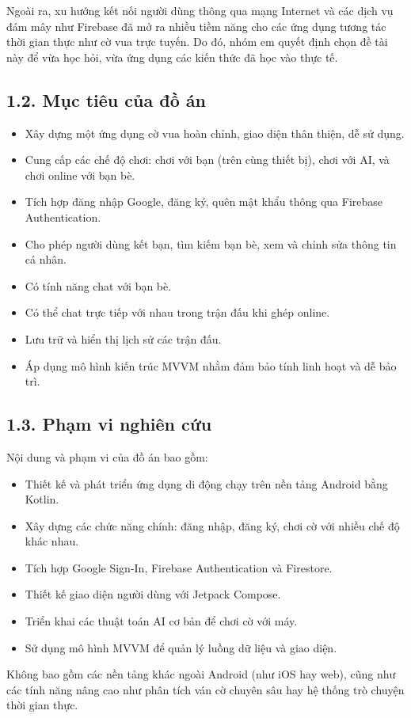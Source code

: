 \documentclass[a4paper,12pt]{article}
\begin{document}
\noindent Ngoài ra, xu hướng kết nối người dùng thông qua mạng Internet và các dịch vụ đám mây như Firebase đã mở ra nhiều tiềm năng cho các ứng dụng tương tác thời gian thực như cờ vua trực tuyến. Do đó, nhóm em quyết định chọn đề tài này để vừa học hỏi, vừa ứng dụng các kiến thức đã học vào thực tế.

\subsection*{1.2. Mục tiêu của đồ án} %

\justify
\begin{itemize}[label=·] %
    \item Xây dựng một ứng dụng cờ vua hoàn chỉnh, giao diện thân thiện, dễ sử dụng.
    \item Cung cấp các chế độ chơi: chơi với bạn (trên cùng thiết bị), chơi với AI, và chơi online với bạn bè.
    \item Tích hợp đăng nhập Google, đăng ký, quên mật khẩu thông qua Firebase Authentication.
    \item Cho phép người dùng kết bạn, tìm kiếm bạn bè, xem và chỉnh sửa thông tin cá nhân.
    \item Có tính năng chat với bạn bè.
    \item Có thể chat trực tiếp với nhau trong trận đấu khi ghép online. 
    \item Lưu trữ và hiển thị lịch sử các trận đấu.
    \item Áp dụng mô hình kiến trúc MVVM nhằm đảm bảo tính linh hoạt và dễ bảo trì.
\end{itemize}

\subsection*{1.3. Phạm vi nghiên cứu}

\justify
\noindent Nội dung và phạm vi của đồ án bao gồm:
\begin{itemize}[label=·]
    \item Thiết kế và phát triển ứng dụng di động chạy trên nền tảng Android bằng Kotlin.
    \item Xây dựng các chức năng chính: đăng nhập, đăng ký, chơi cờ với nhiều chế độ khác nhau.
    \item Tích hợp Google Sign-In, Firebase Authentication và Firestore.
    \item Thiết kế giao diện người dùng với Jetpack Compose.
    \item Triển khai các thuật toán AI cơ bản để chơi cờ với máy.
    \item Sử dụng mô hình MVVM để quản lý luồng dữ liệu và giao diện.
\end{itemize}
\noindent Không bao gồm các nền tảng khác ngoài Android (như iOS hay web), cũng như các tính năng nâng cao như phân tích ván cờ chuyên sâu hay hệ thống trò chuyện thời gian thực.
\end{document}
